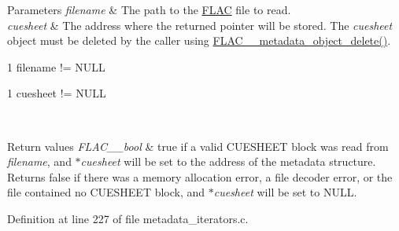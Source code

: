 \begin{DoxyParams}{Parameters}
{\em filename} & The path to the \hyperlink{namespace_f_l_a_c}{F\+L\+AC} file to read. \\
\hline
{\em cuesheet} & The address where the returned pointer will be stored. The {\itshape cuesheet} object must be deleted by the caller using \hyperlink{group__flac__metadata__object_ga66bbe27dba68ba77be5af83986a280ea}{F\+L\+A\+C\+\_\+\+\_\+metadata\+\_\+object\+\_\+delete()}.  
\begin{DoxyCode}
1 filename != NULL 
\end{DoxyCode}
 
\begin{DoxyCode}
1 cuesheet != NULL 
\end{DoxyCode}
 \\
\hline
\end{DoxyParams}

\begin{DoxyRetVals}{Return values}
{\em F\+L\+A\+C\+\_\+\+\_\+bool} & {\ttfamily true} if a valid C\+U\+E\+S\+H\+E\+ET block was read from {\itshape filename}, and {\itshape $\ast$cuesheet} will be set to the address of the metadata structure. Returns {\ttfamily false} if there was a memory allocation error, a file decoder error, or the file contained no C\+U\+E\+S\+H\+E\+ET block, and {\itshape $\ast$cuesheet} will be set to {\ttfamily N\+U\+LL}. \\
\hline
\end{DoxyRetVals}


Definition at line 227 of file metadata\+\_\+iterators.\+c.

